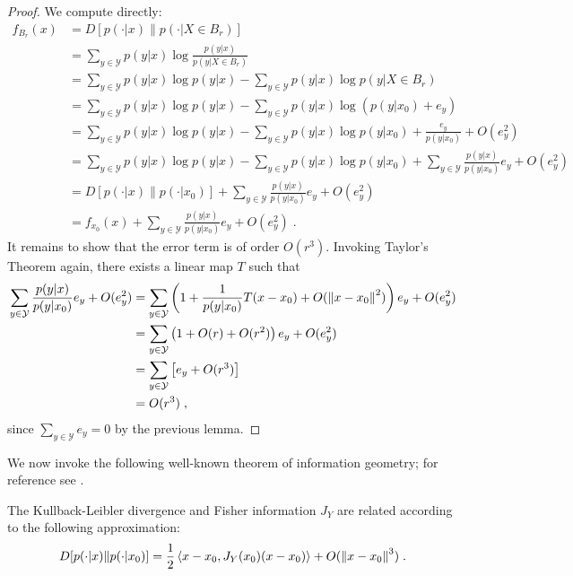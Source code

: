 	\begin{proof}
		We compute directly: 
		\begin{align}
			f_{B_r}(x) &= D[p(\cdot|x)\|p(\cdot|X \in B_r)] \\
			&= \sum_{y\in \mathcal{Y}} p(y|x) \log \frac{p(y|x)}{p(y|X \in B_r)} \\
			&= \sum_{y\in \mathcal{Y}} p(y|x) \log p(y|x) - \sum_{y \in \mathcal{Y}} p(y|x) \log p(y|X \in B_r)\; \\
			&= \sum_{y\in \mathcal{Y}} p(y|x) \log p(y|x) - \sum_{y \in \mathcal{Y}} p(y|x) \log (p(y|x_0) + e_y) \\ 
			&= \sum_{y\in \mathcal{Y}} p(y|x) \log p(y|x) - \sum_{y \in \mathcal{Y}} p(y|x) \log p(y|x_0) + \frac{e_y}{p(y|x_0)} + O(e_y^2)   \\
			&= \sum_{y\in \mathcal{Y}} p(y|x) \log p(y|x) - \sum_{y \in \mathcal{Y}} p(y|x) \log p(y|x_0) + \sum_{y\in \mathcal{Y}} \frac{p(y|x)}{p(y|x_0)}e_y + O(e_y^2) \\
			&= D[p(\cdot|x)\|p(\cdot|x_0)] + \sum_{y\in \mathcal{Y}} \frac{p(y|x)}{p(y|x_0)}e_y + O(e_y^2) \\
			&= f_{x_0}(x) + \sum_{y\in \mathcal{Y}} \frac{p(y|x)}{p(y|x_0)}e_y + O(e_y^2)\;.
		\end{align}
		It remains to show that the error term is of order $O(r^3)$. Invoking Taylor's Theorem again, there exists a linear map $T$ such that 
		\begin{align}
			\sum_{y\in \mathcal{Y}} \frac{p(y|x)}{p(y|x_0)}e_y + O(e_y^2) &= \sum_{y\in \mathcal{Y}} \left(1 +  \frac{1}{p(y|x_0)} T(x - x_0) + O(\left\lVert x - x_0\right\rVert^2) \right)e_y + O(e_y^2) \\
			&= \sum_{y\in \mathcal{Y}} \left(1 +  O(r) + O(r^2) \right)e_y + O(e_y^2) \\
			&= \sum_{y\in\mathcal{Y}}\left[e_y + O(r^3)\right] \\
			&= O(r^3)\;, 
		\end{align}
		since $\sum_{y\in \mathcal{Y}} e_y = 0$ by the previous lemma. 
	\end{proof}

	We now invoke the following well-known theorem of information geometry; for reference see \cite{Amari2000}. 

	\begin{thm}
		The Kullback-Leibler divergence and Fisher information $J_Y$ are related according to the following approximation: 
		\begin{equation}
			D[p(\cdot|x)\|p(\cdot|x_0)] = \frac{1}{2} \left<x - x_0, J_Y(x_0)(x - x_0)\right> + O(\left\lVert x - x_0\right\rVert^3)\;. 
		\end{equation}
	\end{thm}

